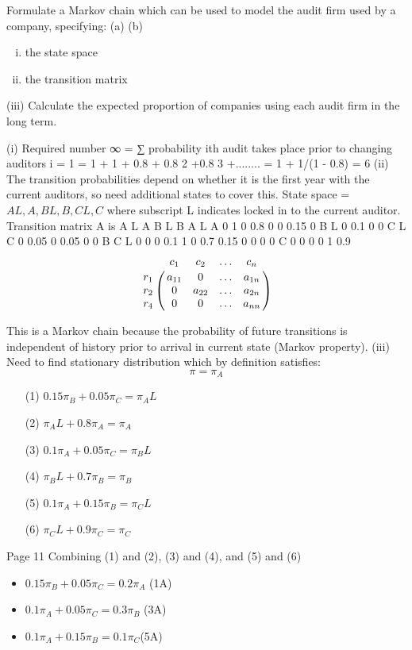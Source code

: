 \documentclass[a4paper,12pt]{article}
\begin{document}
\begin{enumerate}
Formulate a Markov chain which can be used to model the audit firm used by
a company, specifying:
(a)
(b)
\begin{enumerate}[(i)]
\item the state space
\item the transition matrix
\end{enumerate}
(iii)
Calculate the expected proportion of companies using each audit firm in the
long term.
\end{enumerate}


(i)
Required number
∞
= ∑ probability ith audit takes place prior to changing auditors
i = 1
= 1 + 1 + 0.8 + 0.8 2 +0.8 3 +........
= 1 + 1/(1 - 0.8) = 6
(ii)
The transition probabilities depend on
whether it is the first year with the
current auditors, so need additional states to cover this.
State space = ${A L , A, B L , B, C L , C}$ where subscript L
indicates locked in to the current auditor.
Transition matrix A is
A L
A
B L
B A L
A
0
1
0
0.8
0
0
0.15 0 B L
0
0.1
0
0
C L
C 0
0.05 0
0.05
0
0
B C L
0
0
0
0.1
1
0
0.7 0.15
0
0
0
0
C
0
0
0
0
1
0.9
$$\bordermatrix{ &c_1&c_2&\ldots &c_n\cr
                r_1&a_{11} &  0  & \ldots & a_{1n}\cr
                r_2& 0  &  a_{22} & \ldots & a_{2n}\cr
                r_4& 0  &   0       &\ldots & a_{nn}}$$
                
This is a Markov chain because the probability
of future transitions is independent of history
prior to arrival in current state (Markov property).
(iii)
Need to find stationary distribution
\pi which by definition satisfies:
\[\pi = \pi_A\]

\begin{itemize}
    \item[(1)] ${ \displaystyle0.15 \pi_B + 0.05 \pi_C = \pi_A L }$
    \item[(2)] ${ \displaystyle \pi_A L + 0.8 \pi_A = \pi_A }$
    \item[(3)] ${ \displaystyle 0.1 \pi_A + 0.05 \pi_C = \pi_B L }$
    \item[(4)] ${ \displaystyle \pi_B L + 0.7 \pi_B = \pi_B }$
    \item[(5)] ${ \displaystyle 0.1 \pi_A + 0.15 \pi_B = \pi_C L }$
    \item[(6)] ${ \displaystyle \pi_C L + 0.9 \pi_C = \pi_C }$
\end{itemize}

Page 11%
Combining (1) and (2), (3) and (4), and (5) and (6)
\begin{itemize}
    \item
${ \displaystyle 0.15 \pi_B + 0.05 \pi_C = 0.2 \pi_A }$ (1A)
\item ${ \displaystyle 0.1 \pi_A + 0.05 \pi_C = 0.3 \pi_B}$ (3A)
\item ${ \displaystyle 0.1 \pi_A + 0.15 \pi_B = 0.1 \pi_C }$(5A)
\end{itemize}
\end{document}
